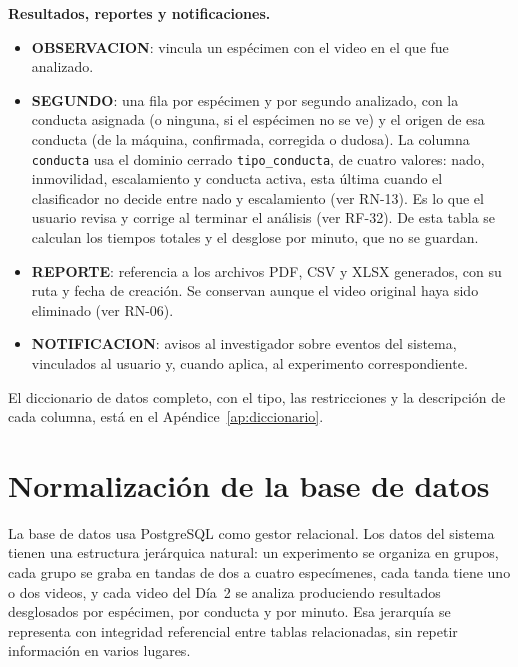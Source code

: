 \textbf{Resultados, reportes y notificaciones.}
\begin{itemize}
  \item \textbf{OBSERVACION}: vincula un espécimen con el video en el que
        fue analizado.

  \item \textbf{SEGUNDO}: una fila por espécimen y por segundo analizado, con
        la conducta asignada (o ninguna, si el espécimen no se ve) y el origen
        de esa conducta (de la máquina, confirmada, corregida o dudosa). La
        columna \texttt{conducta} usa el dominio cerrado \texttt{tipo\_conducta},
        de cuatro valores: nado, inmovilidad, escalamiento y conducta activa, esta
        última cuando el clasificador no decide entre nado y escalamiento (ver
        RN-13). Es lo que el usuario revisa y corrige al terminar el análisis (ver
        RF-32). De esta tabla se calculan los tiempos totales y el desglose por
        minuto, que no se guardan.

  \item \textbf{REPORTE}: referencia a los archivos PDF, CSV y XLSX
        generados, con su ruta y fecha de creación. Se conservan aunque el
        video original haya sido eliminado (ver RN-06).

  \item \textbf{NOTIFICACION}: avisos al investigador sobre eventos del
        sistema, vinculados al usuario y, cuando aplica, al experimento
        correspondiente.
\end{itemize}

El diccionario de datos completo, con el tipo, las restricciones y la descripción
de cada columna, está en el Apéndice~\ref{ap:diccionario}.

\section{Normalización de la base de datos}
\label{sec:normalizacion}

La base de datos usa PostgreSQL como gestor relacional. Los datos del sistema
tienen una estructura jerárquica natural: un experimento se organiza en grupos,
cada grupo se graba en tandas de dos a cuatro especímenes, cada tanda tiene uno
o dos videos, y cada video del Día~2 se analiza produciendo resultados desglosados por
espécimen, por conducta y por minuto. Esa jerarquía se representa con integridad
referencial entre tablas relacionadas, sin repetir información en varios
lugares.

